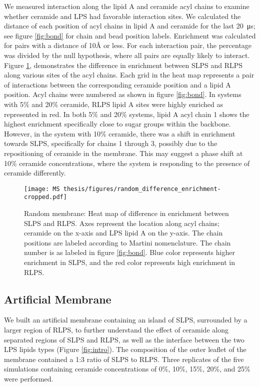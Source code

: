 \documentclass[10pt, letterpaper]{article}
\begin{document}
\newpage
We measured interaction along the lipid A and ceramide acyl chains to examine whether ceramide and LPS had favorable interaction sites. We calculated the distance of each position of acyl chains in lipid A and ceramide for the last \SI{20}{\micro\second}; see figure \ref{fig:bond} for chain and bead position labels. Enrichment was calculated for pairs with a distance of 10\si{\angstrom} or less. For each interaction pair, the percentage was divided by the null hypothesis, where all pairs are equally likely to interact.  
Figure \ref{fig:rand_enrichment}, demonstrates the difference in enrichment between SLPS and RLPS along various sites of the acyl chains. Each grid in the heat map represents a pair of interactions between the corresponding ceramide position and a lipid A position. Acyl chains were numbered as shown in figure \ref{fig:bond}. 
In systems with 5\% and 20\% ceramide, RLPS lipid A sites were highly enriched as represented in red. In both 5\% and 20\% systems, lipid A acyl chain 1 shows the highest enrichment specifically close to sugar groups within the backbone. However, in the system with 10\% ceramide, there was a shift in enrichment towards SLPS, specifically for chains 1 through 3, possibly due to the repositioning of ceramide in the membrane. This may suggest a phase shift at 10\% ceramide concentrations, where the system is responding to the presence of ceramide differently. 



\begin{figure}[H]
  \centerline{\texttt{[image: MS thesis/figures/random\_difference\_enrichment-cropped.pdf]}}
  \caption[Random Membrane: Ceramide Enrichment]{Random membrane: Heat map of difference in enrichment between SLPS and RLPS. Axes represent the location along acyl chains; ceramide on the x-axis and LPS lipid A on the y-axis. The chain positions are labeled according to Martini nomenclature. The chain number is as labeled in figure \ref{fig:bond}. Blue color represents higher enrichment in SLPS, and the red color represents high enrichment in RLPS.}
  \label{fig:rand_enrichment}
\end{figure}

\newpage
 
\subsection{Artificial Membrane}
\par We built an artificial membrane containing an island of SLPS, surrounded by a larger region of RLPS, to further understand the effect of ceramide along separated regions of SLPS and RLPS, as well as the interface between the two LPS lipids types (Figure \ref{fig:intro}).
The composition of the outer leaflet of the membrane contained a 1:3 ratio of SLPS to RLPS. Three replicates of the five simulations containing ceramide concentrations of  0\%, 10\%, 15\%, 20\%, and 25\% were performed. 
\end{document}

